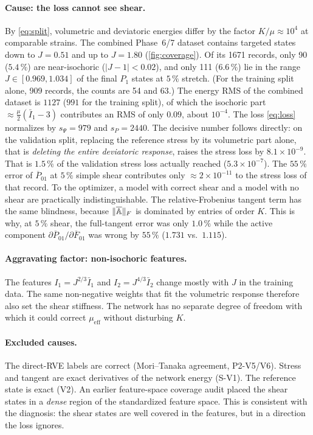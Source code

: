 \paragraph{Cause: the loss cannot see shear.} By \cref{eq:split}, volumetric and
deviatoric energies differ by the factor $K/\mu\approx10^4$ at comparable strains.
The combined Phase~6/7 dataset contains targeted states down to $J=0.51$ and up to $J=1.80$
(\cref{fig:coverage}). Of its 1671 records, only 90 ($5.4\,\%$) are near-isochoric ($|J-1|<0.02$), and only 111 ($6.6\,\%$) lie in the range $J\in[0.969,1.034]$ of the final $P_1$ states at $5\,\%$ stretch. (For the training split alone, 909 records, the counts are 54 and 63.) The
energy RMS of the combined dataset is $1127$ ($991$ for the training split), of which the isochoric part
$\approx\tfrac{\mu}{2}(\bar I_1-3)$ contributes an RMS of only $0.09$, about
$10^{-4}$. The loss \cref{eq:loss} normalizes by $s_\Psi=979$ and $s_P=2440$. The
decisive number follows directly: on the validation split, replacing the reference
stress by its volumetric part alone, that is \emph{deleting the entire deviatoric
response}, raises the stress loss by $8.1\times10^{-9}$. That is $1.5\,\%$ of the
validation stress loss actually reached ($5.3\times10^{-7}$). The $55\,\%$ error of $\overline P_{01}$ at $5\,\%$ simple shear contributes
only $\approx2\times10^{-11}$ to the stress loss of that record. To the optimizer, a model with
correct shear and a model with no shear are practically indistinguishable. The
relative-Frobenius tangent term has the same blindness, because $\|\overline{\mathbb A}\|_F$ is
dominated by entries of order $K$. This is why, at $5\,\%$ shear, the full-tangent
error was only $1.0\,\%$ while the active component
$\partial\overline P_{01}/\partial\overline F_{01}$ was wrong by $55\,\%$
($1.731$ vs.\ $1.115$).

\paragraph{Aggravating factor: non-isochoric features.} The features
$I_1=J^{2/3}\bar I_1$ and $I_2=J^{4/3}\bar I_2$ change mostly with $J$ in the
training data. The same non-negative weights that fit the volumetric response
therefore also set the shear stiffness. The network has no separate degree of
freedom with which it could correct $\mu_{\mathrm{eff}}$ without disturbing $K$.

\paragraph{Excluded causes.} The direct-RVE labels are correct (Mori--Tanaka
agreement, P2-V5/V6). Stress and tangent are exact derivatives of the network
energy (S-V1). The reference state is exact (V2). An earlier feature-space
coverage audit placed the shear states in a \emph{dense} region of the
standardized feature space. This is consistent with the diagnosis: the shear
states are well covered in the features, but in a direction the loss ignores.

